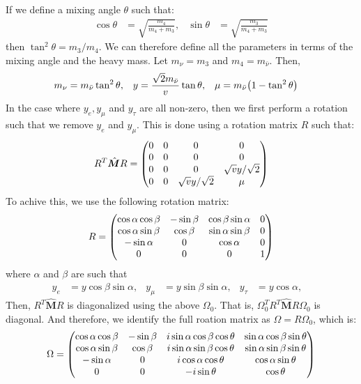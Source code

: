 \documentclass[a4paper,11pt]{article} \pdfoutput=1
\newcommand{\rhn}{\bar{\nu}}
\begin{document}
If we define a mixing angle \(\theta\) such that:
\begin{align}
	\cos\theta & = \sqrt{\frac{m_4}{m_4+m_3}}, &
	\sin\theta & = \sqrt{\frac{m_3}{m_4+m_3}}
\end{align}
then \(\tan^2\theta = m_{3}/m_{4}\). We can therefore define all the parameters in
terms of the mixing angle and the heavy mass. Let \(m_{\nu}=m_{3}\) and
\(m_{4} = m_{\rhn}\). Then,
\begin{align}
	m_{\nu} & = m_{\rhn}\tan^2\theta,                 &
	y       & = \frac{\sqrt{2}m_{\rhn}}{v}\tan\theta, &
	\mu     & = m_{\rhn}\qty(1-\tan^2\theta)
\end{align}
In the case where \(y_{e},y_{\mu}\) and \(y_{\tau}\) are all non-zero, then we
first perform a rotation such that we remove \(y_{e}\) and \(y_{\mu}\). This is
done using a rotation matrix \(R\) such that:
\begin{align}
	R^{T}\hat{\bm{M}}R =
	\mqty(
	0 & 0 & 0                  & 0                  \\
	0 & 0 & 0                  & 0                  \\
	0 & 0 & 0                  & \sqrt{v}y/\sqrt{2} \\
	0 & 0 & \sqrt{v}y/\sqrt{2} & \mu                \\
	)
\end{align}
To achive this, we use the following rotation matrix:
\begin{align}
	R = \mqty(
	\cos\alpha\cos\beta & -\sin\beta & \cos\beta\sin\alpha & 0 \\
	\cos\alpha\sin\beta & \cos\beta  & \sin\alpha\sin\beta & 0 \\
	-\sin\alpha         & 0          & \cos\alpha          & 0 \\
	0                   & 0          & 0                   & 1
	)
\end{align}
where \(\alpha\) and \(\beta\) are such that
\begin{align}
	y_{e}    & = y\cos\beta\sin\alpha, &
	y_{\mu}  & = y\sin\beta\sin\alpha, &
	y_{\tau} & = y\cos\alpha,          &
\end{align}
Then, \(R^{T}\hat{\bm{M}}R\) is diagonalized using the above \(\Omega_{0}\). That
is, \(\Omega^{T}_{0}R^{T}\hat{\bm{M}}R\Omega_{0}\) is diagonal. And therefore, we
identify the full roation matrix as \(\Omega = R\Omega_{0}\), which is:
\begin{align}
	\Omega = \mqty(
	\cos\alpha\cos\beta & -\sin\beta & i \sin\alpha\cos\beta\cos\theta & \sin\alpha\cos\beta\sin\theta \\
	\cos\alpha\sin\beta & \cos\beta  & i \sin\alpha\sin\beta\cos\theta & \sin\alpha\sin\beta\sin\theta \\
	-\sin\alpha         & 0          & i \cos\alpha\cos\theta          & \cos\alpha\sin\theta          \\
	0                   & 0          & -i \sin\theta                   & \cos\theta                    \\
	)
\end{align}
\end{document}
